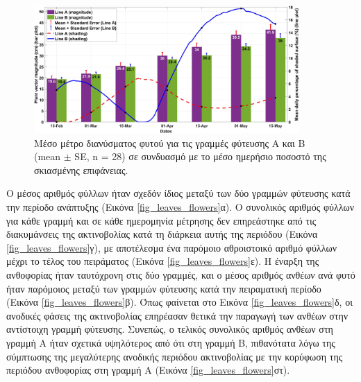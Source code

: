 \documentclass[12pt, a4paper]{report} %
\newcommand{\english}{\foreignlanguage{english}}
\begin{document}
\begin{figure}[H]
    \centering
    \includegraphics[width=0.9\textwidth]{vector_magn.jpg}
    \caption{Μέσο μέτρο διανύσματος φυτού για τις γραμμές φύτευσης Α και Β (\english{mean $\pm$ SE, n = 28}) σε 
    συνδυασμό με το μέσο ημερήσιο ποσοστό της σκιασμένης επιφάνειας.}
    \label{fig_vector_magn}
\end{figure}

Ο μέσος αριθμός φύλλων ήταν σχεδόν ίδιος μεταξύ των δύο γραμμών φύτευσης κατά την περίοδο ανάπτυξης (Εικόνα 
\ref{fig_leaves_flowers}α). Ο συνολικός αριθμός φύλλων για κάθε γραμμή και σε κάθε ημερομηνία μέτρησης δεν επηρεάστηκε από 
τις διακυμάνσεις της ακτινοβολίας κατά τη διάρκεια αυτής της περιόδου (Εικόνα \ref{fig_leaves_flowers}γ), με αποτέλεσμα 
ένα παρόμοιο αθροιστοικό αριθμό φύλλων μέχρι το τέλος του πειράματος (Εικόνα \ref{fig_leaves_flowers}ε). Η έναρξη της 
ανθοφορίας ήταν ταυτόχρονη στις δύο γραμμές, και ο μέσος αριθμός ανθέων ανά φυτό ήταν παρόμοιος μεταξύ των γραμμών φύτευσης 
κατά την πειραματική περίοδο (Εικόνα \ref{fig_leaves_flowers}β). Όπως φαίνεται στο Εικόνα \ref{fig_leaves_flowers}δ, οι 
ανοδικές φάσεις της ακτινοβολίας επηρέασαν θετικά την παραγωγή των ανθέων στην αντίστοιχη γραμμή φύτευσης. Συνεπώς, ο τελικός 
συνολικός αριθμός ανθέων στη γραμμή Α ήταν σχετικά υψηλότερος από ότι στη γραμμή Β, πιθανότατα λόγω της σύμπτωσης της 
μεγαλύτερης ανοδικής περιόδου ακτινοβολίας με την κορύφωση της περιόδου ανθοφορίας στη γραμμή Α (Εικόνα 
\ref{fig_leaves_flowers}στ).
\end{document}
